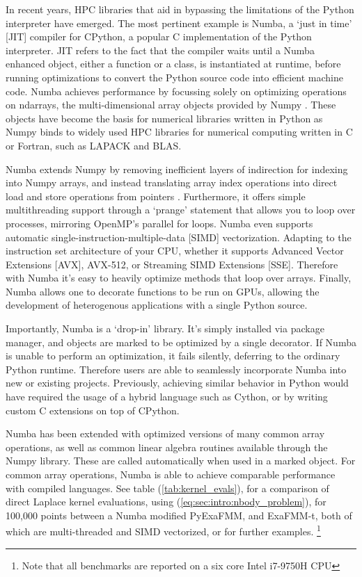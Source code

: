\documentclass{IEEEcsmag}
\begin{document}
In recent years, HPC libraries that aid in bypassing the limitations of the Python interpreter have emerged. The most pertinent example is Numba, a `just in time' [JIT] compiler for CPython, a popular C implementation of the Python interpreter. JIT refers to the fact that the compiler waits until a Numba enhanced object, either a function or a class, is instantiated at runtime, before running optimizations to convert the Python source code into efficient machine code. Numba achieves performance by focussing solely on optimizing operations on ndarrays, the multi-dimensional array objects provided by Numpy . These objects have become the basis for numerical libraries written in Python as Numpy binds to widely used HPC libraries for numerical computing written in C or Fortran, such as LAPACK and BLAS.

Numba extends Numpy by removing inefficient layers of indirection for indexing into Numpy arrays, and instead translating array index operations into direct load and store operations from pointers \cite{Lam2015}. Furthermore, it offers simple multithreading support through a `prange' statement that allows you to loop over processes, mirroring OpenMP's parallel for loops. Numba even supports automatic single-instruction-multiple-data [SIMD] vectorization. Adapting to the instruction set architecture of your CPU, whether it supports Advanced Vector Extensions [AVX], AVX-512, or  Streaming SIMD Extensions [SSE]. Therefore with Numba it's easy to heavily optimize methods that loop over arrays. Finally, Numba allows one to decorate functions to be run on GPUs, allowing the development of heterogenous applications with a single Python source.

Importantly, Numba is a `drop-in' library. It's simply installed via package manager, and objects are marked to be optimized by a single decorator. If Numba is unable to perform an optimization, it fails silently, deferring to the ordinary Python runtime. Therefore users are able to seamlessly incorporate Numba into new or existing projects. Previously, achieving similar behavior in Python would have required the usage of a hybrid language such as Cython, or by writing custom C extensions on top of CPython.

Numba has been extended with optimized versions of many common array operations, as well as common linear algebra routines available through the Numpy library. These are called automatically when used in a marked object. For common array operations, Numba is able to achieve comparable performance with compiled languages. See table (\ref{tab:kernel_evals}), for a comparison of direct Laplace kernel evaluations, using (\ref{eq:sec:intro:nbody_problem}), for 100,000 points between a Numba modified PyExaFMM, and ExaFMM-t, both of which are multi-threaded and SIMD vectorized, or \cite{Lam2015} for further examples. \footnote[1]{Note that all benchmarks are reported on a six core Intel i7-9750H CPU}
\end{document}
